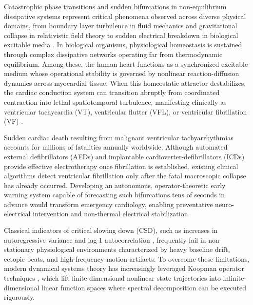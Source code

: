 \documentclass[11pt,a4paper]{article}
\begin{document}
Catastrophic phase transitions and sudden bifurcations in non-equilibrium dissipative systems represent critical phenomena observed across diverse physical domains, from boundary layer turbulence in fluid mechanics and gravitational collapse in relativistic field theory to sudden electrical breakdown in biological excitable media \cite{Scheffer2009, Strogatz2014}. In biological organisms, physiological homeostasis is sustained through complex dissipative networks operating far from thermodynamic equilibrium. Among these, the human heart functions as a synchronized excitable medium whose operational stability is governed by nonlinear reaction-diffusion dynamics across myocardial tissue. When this homeostatic attractor destabilizes, the cardiac conduction system can transition abruptly from coordinated contraction into lethal spatiotemporal turbulence, manifesting clinically as ventricular tachycardia (VT), ventricular flutter (VFL), or ventricular fibrillation (VF) \cite{Goldberger2000, Karma2013}.

Sudden cardiac death resulting from malignant ventricular tachyarrhythmias accounts for millions of fatalities annually worldwide. Although automated external defibrillators (AEDs) and implantable cardioverter-defibrillators (ICDs) provide effective electrotherapy once fibrillation is established, existing clinical algorithms detect ventricular fibrillation only after the fatal macroscopic collapse has already occurred. Developing an autonomous, operator-theoretic early warning system capable of forecasting such bifurcations tens of seconds in advance would transform emergency cardiology, enabling preventative neuro-electrical intervention and non-thermal electrical stabilization.

Classical indicators of critical slowing down (CSD), such as increases in autoregressive variance and lag-1 autocorrelation \cite{Scheffer2009, Dakos2012}, frequently fail in non-stationary physiological environments characterized by heavy baseline drift, ectopic beats, and high-frequency motion artifacts. To overcome these limitations, modern dynamical systems theory has increasingly leveraged Koopman operator techniques \cite{Koopman1931, Mezi2005, Brunton2016}, which lift finite-dimensional nonlinear state trajectories into infinite-dimensional linear function spaces where spectral decomposition can be executed rigorously.
\end{document}
